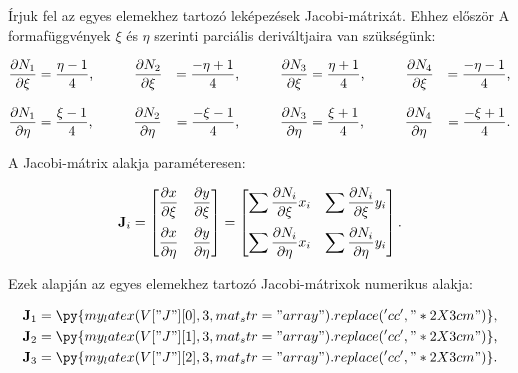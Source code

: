 Írjuk fel az egyes elemekhez tartozó leképezések Jacobi-mátrixát. Ehhez először
A formafüggvények $\xi$ és $\eta$ szerinti parciális deriváltjaira van
szükségünk:
\begin{myframe}
  \begin{alignat}{9}
    \pdv{N_1}{\xi}  & = \frac{\eta - 1}{4}
    \text, \qquad \quad
    \pdv{N_2}{\xi}  & = \frac{-\eta + 1}{4}
    \text, \qquad \quad
    \pdv{N_3}{\xi}  & = \frac{\eta + 1}{4}
    \text, \qquad \quad
    \pdv{N_4}{\xi}  & = \frac{-\eta - 1}{4}
    \text,                                  \\[3mm]
    \pdv{N_1}{\eta} & = \frac{\xi - 1}{4}
    \text, \qquad \quad
    \pdv{N_2}{\eta} & = \frac{-\xi - 1}{4}
    \text, \qquad \quad
    \pdv{N_3}{\eta} & = \frac{\xi + 1}{4}
    \text, \qquad \quad
    \pdv{N_4}{\eta} & = \frac{-\xi + 1}{4}
    \text.
  \end{alignat}
\end{myframe}
A Jacobi-mátrix alakja paraméteresen:
\begin{myframe}
  \begin{equation}
    \mathbf{J}_i = \begin{bmatrix}
      \displaystyle \pdv{x}{\xi}  &
      \displaystyle \pdv{y}{\xi}    \\[4mm]
      \displaystyle \pdv{x}{\eta} &
      \displaystyle \pdv{y}{\eta}   \\
    \end{bmatrix} = \begin{bmatrix}
      \displaystyle \sum \pdv{N_i}{\xi} x_i  &
      \displaystyle \sum \pdv{N_i}{\xi} y_i    \\[4mm]
      \displaystyle \sum \pdv{N_i}{\eta} x_i &
      \displaystyle \sum \pdv{N_i}{\eta} y_i   \\
    \end{bmatrix}
    \text.
  \end{equation}
\end{myframe}
Ezek alapján az egyes elemekhez tartozó Jacobi-mátrixok numerikus alakja:
\begin{myframe}
  \begin{align}
    \rmat J_1 & =
    \py{my_latex(V["J"][0], 3, mat_str="array").replace('cc', "*{2}{X{3cm}}")}
    \text,
    \\
    \rmat J_2 & =
    \py{my_latex(V["J"][1], 3, mat_str="array").replace('cc', "*{2}{X{3cm}}")}
    \text,
    \\
    \rmat J_3 & =
    \py{my_latex(V["J"][2], 3, mat_str="array").replace('cc', "*{2}{X{3cm}}")}
    \text.
  \end{align}
\end{myframe}
